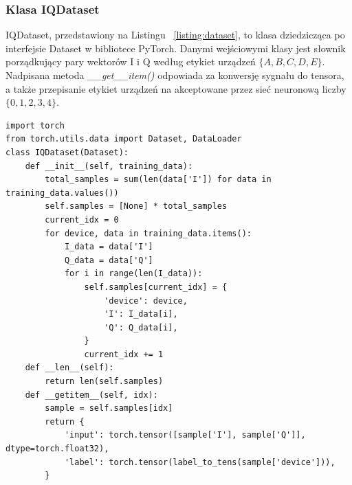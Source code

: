 \subsubsection{Klasa IQDataset}
IQDataset, przedstawiony na Listingu ~\ref{listing:dataset}, to klasa dziedzicząca po interfejsie Dataset w bibliotece PyTorch. Danymi wejściowymi klasy jest słownik porządkujący pary wektorów I i Q według etykiet urządzeń $\{A, B, C, D, E\}$. Nadpisana metoda \textit{\_\_get\_\_item()} odpowiada za konwersję sygnału do tensora, a także przepisanie etykiet urządzeń na akceptowane przez sieć neuronową liczby $\{0,1,2,3,4\}$.
\begin{listing}[H]
\begin{verbatim}
import torch
from torch.utils.data import Dataset, DataLoader
class IQDataset(Dataset):
    def __init__(self, training_data):
        total_samples = sum(len(data['I']) for data in training_data.values())
        self.samples = [None] * total_samples
        current_idx = 0
        for device, data in training_data.items():
            I_data = data['I']
            Q_data = data['Q']
            for i in range(len(I_data)):
                self.samples[current_idx] = {
                    'device': device,
                    'I': I_data[i],
                    'Q': Q_data[i],
                }
                current_idx += 1
    def __len__(self):
        return len(self.samples)
    def __getitem__(self, idx):
        sample = self.samples[idx]
        return {
            'input': torch.tensor([sample['I'], sample['Q']], dtype=torch.float32),
            'label': torch.tensor(label_to_tens(sample['device'])),
        }
\end{verbatim}
\caption{Implementacja klasy IQDataset w języku Python.} \label{listing:dataset}
\end{listing}
